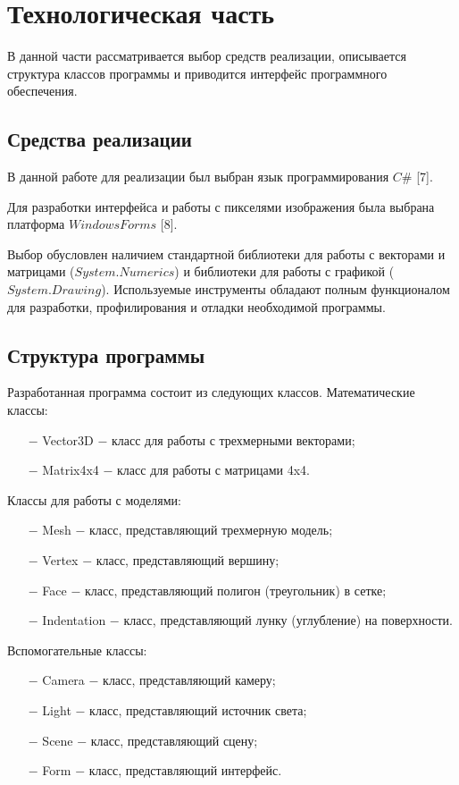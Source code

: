 \chapter{Технологическая часть}

В данной части рассматривается выбор средств реализации, описывается структура классов программы и приводится интерфейс программного обеспечения.

\section{Средства реализации}
В данной работе для реализации был выбран язык программирования $C\#$ [7].

Для разработки интерфейса и работы с пикселями изображения была выбрана платформа $Windows Forms$ [8].

Выбор обусловлен наличием стандартной библиотеки для работы с векторами и матрицами ($System.Numerics$) и библиотеки для работы с графикой ($System.Drawing$). Используемые инструменты обладают полным функционалом для разработки, профилирования и отладки необходимой программы. 

\section{Структура программы}
Разработанная программа состоит из следующих классов. Математические классы:
\begin{itemize}
    \item[$-$] Vector3D $-$ класс для работы с трехмерными векторами;
    \item[$-$] Matrix4x4 $-$ класс для работы с матрицами 4x4.
\end{itemize}

Классы для работы с моделями:
\begin{itemize}
    \item[$-$] Mesh $-$ класс, представляющий трехмерную модель;
    \item[$-$] Vertex $-$ класс, представляющий вершину;
    \item[$-$] Face $-$ класс, представляющий полигон (треугольник) в сетке;
    \item[$-$] Indentation $-$ класс, представляющий лунку (углубление) на поверхности.
\end{itemize}

\clearpage
Вспомогательные классы:
\begin{itemize}
    \item[$-$] Camera $-$ класс, представляющий камеру;
    \item[$-$] Light $-$ класс, представляющий источник света;
    \item[$-$] Scene $-$ класс, представляющий сцену;
    \item[$-$] Form $-$ класс, представляющий интерфейс.
\end{itemize}

